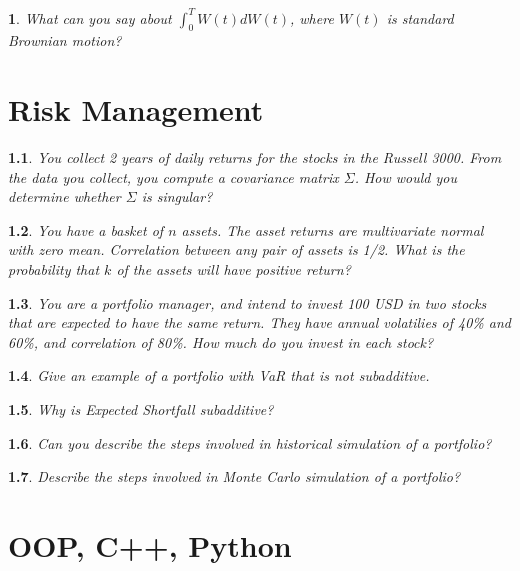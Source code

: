 \documentclass{report}
\newtheorem{problem}{}
\numberwithin{problem}{chapter} %
\begin{document}
\begin{problem}
\cite{CRACK} What can you say about $\int_0^{T} W(t)dW(t)$, where $W(t)$ is standard Brownian motion?
\end{problem}

\chapter{Risk Management}

\begin{problem}
You collect 2 years of daily returns for the stocks in the Russell 3000. From the data you collect, you compute a covariance matrix $\Sigma$. How would you determine whether $\Sigma$ is singular?
\end{problem}

\begin{problem}
You have a basket of $n$ assets. The asset returns are multivariate normal with zero mean. Correlation between any pair of assets is 1/2. What is the probability that $k$ of the assets will have positive return?
\end{problem}

\begin{problem}
\cite{CRACK} You are a portfolio manager, and intend to invest 100 USD in two stocks that are expected to have the same return. They have annual volatilies of 40\% and 60\%, and correlation of 80\%.  How much do you invest in each stock?
\end{problem}

\begin{problem}
Give an example of a portfolio with VaR that is not subadditive.
\end{problem}

\begin{problem}
Why is Expected Shortfall subadditive?
\end{problem}

\begin{problem}
Can you describe the steps involved in historical simulation of a portfolio?
\end{problem}

\begin{problem}
Describe the steps involved in Monte Carlo simulation of a portfolio?
\end{problem}

\chapter{OOP, C++, Python}
\end{document}
